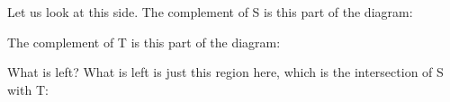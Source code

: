 \documentclass[pdftex, brazil, 12pt, twoside]{article}
\begin{document}
Let us look at this side.
The complement of S is this part of the diagram:

\begin{figure}[H]
  \begin{center}
  \end{center}
\end{figure}

The complement of T is this part of the diagram:

\begin{figure}[H]
  \begin{center}
  \end{center}
\end{figure}

What is left?
What is left is just this region here, which is the
intersection of S with T:

\begin{figure}[H]
  \begin{center}
  \end{center}
\end{figure}
\end{document}
